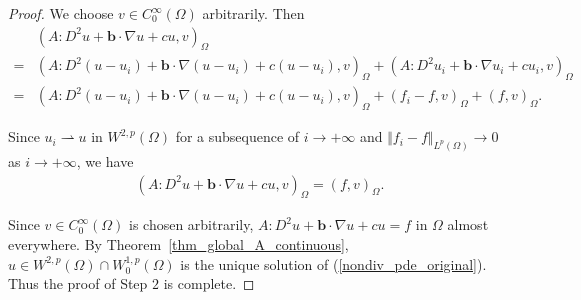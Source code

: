 \documentclass[10pt,a4paper]{amsart}
\begin{document}
\begin{proof}
We choose $v \in C_{0}^{\infty}(\Omega)$ arbitrarily. Then 
\begin{align*}
& (A:D^{2} u + \boldsymbol{b}\cdot \nabla u + cu, v)_{\Omega} \\
= & (A:D^{2}(u - u_{i}) + \boldsymbol{b}\cdot \nabla (u - u_{i}) 
+ c(u - u_{i}), v)_{\Omega} 
+ (A:D^{2}u_{i} + \boldsymbol{b}\cdot\nabla u_{i} + c u_{i}, v)_{\Omega} \\
= & (A:D^{2}(u - u_{i}) + \boldsymbol{b}\cdot \nabla (u - u_{i}) 
+ c(u - u_{i}), v)_{\Omega} + (f_{i} - f, v)_{\Omega}
+ (f, v)_{\Omega}. 
\end{align*}

Since $u_{i} \rightharpoonup u \text{ in } W^{2,p}(\Omega)$ for 
a subsequence of $i \rightarrow + \infty$ and 
$\Vert f_{i} - f \Vert_{L^{p}(\Omega)} \rightarrow 0$ as 
$i \rightarrow + \infty$, we have 
\begin{align*}
(A:D^{2} u + \boldsymbol{b}\cdot \nabla u 
+ c u, v)_{\Omega} = (f, v)_{\Omega}.
\end{align*}

Since $v \in C_{0}^{\infty}(\Omega)$ is chosen arbitrarily, 
$A:D^{2}u +  \boldsymbol{b}\cdot \nabla u + c u= f$ in $\Omega$ almost everywhere. 
By Theorem~\ref{thm_global_A_continuous}, 
$u \in W^{2,p}(\Omega)\cap W_{0}^{1,p}(\Omega)$ is the unique solution of 
(\ref{nondiv_pde_original}). Thus the proof of Step $2$ is complete. 
\end{proof}
\end{document}
